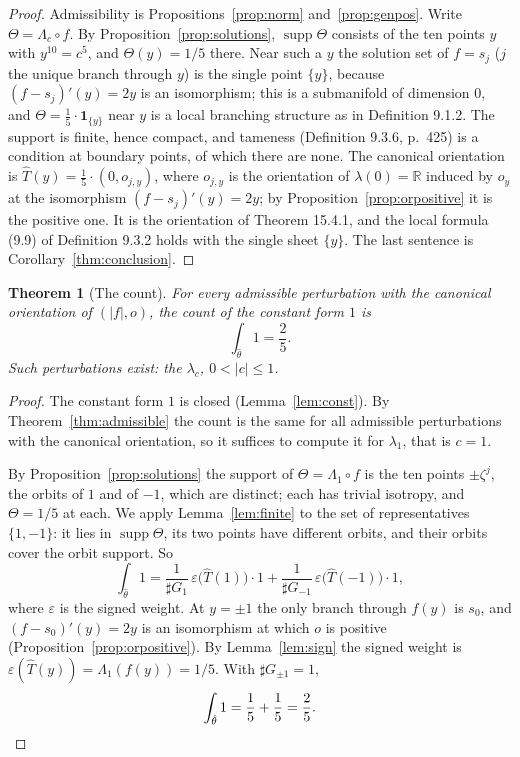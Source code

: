 \documentclass[11pt,a4paper]{article}
\theoremstyle{plain}
\newtheorem{theorem}{Theorem}[section]
\theoremstyle{definition}
\theoremstyle{remark}
\newcommand{\R}{\mathbb{R}}
\newcommand{\abs}[1]{\lvert #1\rvert}
\newcommand{\card}{\sharp}
\newcommand{\supp}{\operatorname{supp}}
\begin{document}
\begin{proof}
Admissibility is Propositions~\ref{prop:norm} and~\ref{prop:genpos}. Write $\Theta=\Lambda_c\circ f$. By
Proposition~\ref{prop:solutions}, $\supp\Theta$ consists of the ten points $y$ with $y^{10}=c^5$, and
$\Theta(y)=1/5$ there. Near such a $y$ the solution set of $f=s_j$ ($j$ the unique branch through $y$)
is the single point $\{y\}$, because $(f-s_j)'(y)=2y$ is an isomorphism; this is a submanifold of
dimension $0$, and $\Theta=\frac15\cdot\mathbf 1_{\{y\}}$ near $y$ is a local branching structure as in
Definition 9.1.2. The support is finite, hence compact, and tameness (Definition 9.3.6, p.~425) is a
condition at boundary points, of which there are none. The canonical orientation is
$\hat T(y)=\frac15\cdot(0,o_{j,y})$, where $o_{j,y}$ is the orientation of $\lambda(0)=\R$ induced by
$o_y$ at the isomorphism $(f-s_j)'(y)=2y$; by Proposition~\ref{prop:orpositive} it is the positive one.
It is the orientation of Theorem 15.4.1, and the local formula (9.9) of Definition 9.3.2 holds with the
single sheet $\{y\}$. The last sentence is Corollary~\ref{thm:conclusion}.
\end{proof}

\begin{theorem}[The count]\label{thm:count}
For every admissible perturbation with the canonical orientation of $(\abs f,o)$, the count of the
constant form $1$ is
\[
  \int_{\hat\theta}1=\frac25 .
\]
Such perturbations exist: the $\lambda_c$, $0<\abs c\le1$.
\end{theorem}

\begin{proof}
The constant form $1$ is closed (Lemma~\ref{lem:const}). By Theorem~\ref{thm:admissible} the count is
the same for all admissible perturbations with the canonical orientation, so it suffices to compute it
for $\lambda_1$, that is $c=1$.

By Proposition~\ref{prop:solutions} the support of $\Theta=\Lambda_1\circ f$ is the ten points
$\pm\zeta^j$, the orbits of $1$ and of $-1$, which are distinct; each has trivial isotropy, and
$\Theta=1/5$ at each. We apply Lemma~\ref{lem:finite} to the set of representatives $\{1,-1\}$: it lies in
$\supp\Theta$, its two points have different orbits, and their orbits cover the orbit support. So
\[
  \int_{\hat\theta}1=\frac1{\card G_1}\,\varepsilon\bigl(\hat T(1)\bigr)\cdot1
  +\frac1{\card G_{-1}}\,\varepsilon\bigl(\hat T(-1)\bigr)\cdot1,
\]
where $\varepsilon$ is the signed weight. At $y=\pm1$ the only branch through $f(y)$ is $s_0$, and
$(f-s_0)'(y)=2y$ is an isomorphism at which $o$ is positive (Proposition~\ref{prop:orpositive}). By
Lemma~\ref{lem:sign} the signed weight is $\varepsilon(\hat T(y))=\Lambda_1(f(y))=1/5$. With
$\card G_{\pm1}=1$,
\[
  \int_{\hat\theta}1=\frac15+\frac15=\frac25 .\qedhere
\]
\end{proof}
\end{document}
